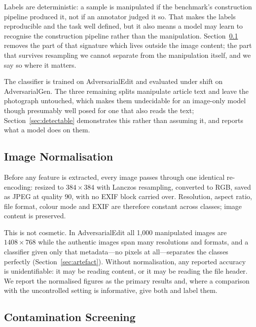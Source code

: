 \documentclass[pdflatex,sn-mathphys-num]{sn-jnl}
\begin{document}
Labels are deterministic: a sample is manipulated if the benchmark's
construction pipeline produced it, not if an annotator judged it so. That makes
the labels reproducible and the task well defined, but it also means a model
may learn to recognise the construction pipeline rather than the manipulation.
Section~\ref{sec:normalise} removes the part of that signature which lives
outside the image content; the part that survives resampling we cannot separate
from the manipulation itself, and we say so where it matters.

The classifier is trained on AdversarialEdit and evaluated under shift on
AdversarialGen. The three remaining splits manipulate article text and leave
the photograph untouched, which makes them undecidable for an image-only model
though presumably well posed for one that also reads the text;
Section~\ref{sec:detectable} demonstrates this rather than assuming it, and
reports what a model does on them.

\subsection{Image Normalisation}
\label{sec:normalise}

Before any feature is extracted, every image passes through one identical
re-encoding: resized to $384 \times 384$ with Lanczos resampling, converted to
RGB, saved as JPEG at quality 90, with no EXIF block carried over. Resolution,
aspect ratio, file format, colour mode and EXIF are therefore constant across
classes; image content is preserved.

This is not cosmetic. In AdversarialEdit all 1{,}000 manipulated images are
$1408 \times 768$ while the authentic images span many resolutions and formats,
and a classifier given only that metadata---no pixels at all---separates the
classes perfectly (Section~\ref{sec:artefact}). Without normalisation, any
reported accuracy is unidentifiable: it may be reading content, or it may be
reading the file header. We report the normalised figures as the primary
results and, where a comparison with the uncontrolled setting is informative,
give both and label them.

\subsection{Contamination Screening}
\label{sec:dedup}
\end{document}
